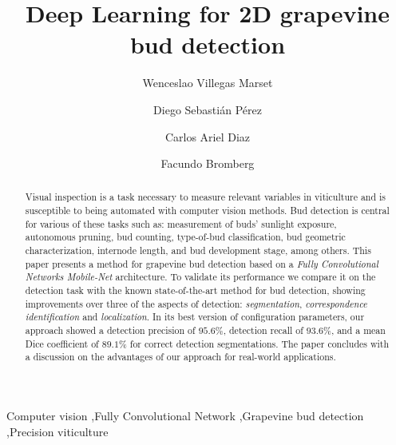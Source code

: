\documentclass[a4paper,authoryear,review]{elsarticle}
\begin{document}
	
	\begin{frontmatter}
		
		\title{Deep Learning for 2D grapevine bud detection}
		
		\author[utn]{Wenceslao Villegas Marset}
		
		\author[utn]{Diego Sebastián Pérez}
		
		\author[utn]{Carlos Ariel Diaz}
		
		\author[utn,conicet]{Facundo Bromberg}
		
		\address[utn]{Universidad Tecnológica Nacional, Facultad Regional Mendoza, Grupo de Inteligencia Artificial DHARMa, Dpto. de Sistemas de la Información. Rodríguez 273, CP 5500, Mendoza, Argentina.}
		
		\address[conicet]{Consejo Nacional de Investigaciones Científicas y Técnicas (CONICET).}
		
		
		\begin{abstract}
			Visual inspection is a task necessary to measure relevant variables in viticulture and is susceptible to being automated with computer vision methods. Bud detection is central for various of these tasks such as: measurement of buds’ sunlight exposure, autonomous pruning, bud counting, type-of-bud classification, bud geometric characterization, internode length, and bud development stage, among others. This paper presents a method for grapevine bud detection based on a \emph{Fully Convolutional Networks Mobile-Net} architecture. To validate its performance we compare it on the detection task with the known state-of-the-art method for bud detection, showing improvements over three of the aspects of detection: \emph{segmentation}, \emph{correspondence identification} and \emph{localization}. In its best version of configuration parameters, our approach showed a detection precision of $95.6\%$, detection recall of $93.6\%$, and a mean Dice coefficient of $89.1\%$ for correct detection segmentations. The paper concludes with a discussion on the  advantages of our approach for real-world applications.
		\end{abstract}
		
		\begin{keyword}
			Computer vision \sep Fully Convolutional Network \sep Grapevine bud detection \sep Precision viticulture
		\end{keyword}
		
	\end{frontmatter}
	
\end{document}
